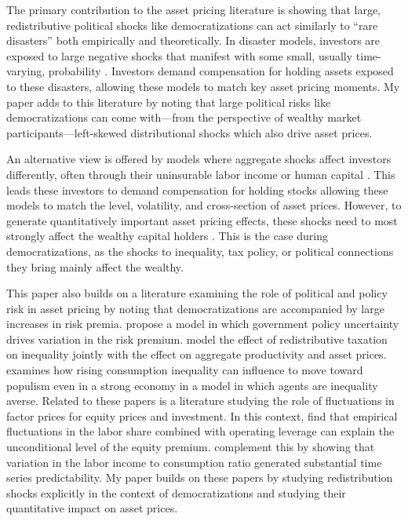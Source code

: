 The primary contribution to the asset pricing literature is showing that large, redistributive political shocks like democratizations can act similarly to ``rare disasters'' both empirically and theoretically. In disaster models, investors are exposed to large negative shocks that manifest with some small, usually time-varying, probability \citep*{Rietz1988,Barro2006a,Gabaix2012,Wachter2013}. Investors demand compensation for holding assets exposed to these disasters, allowing these models to match key asset pricing moments. My paper adds to this literature by noting that large political risks like democratizations can come with---from the perspective of wealthy market participants---left-skewed distributional shocks which also drive asset prices.

An alternative view is offered by models where aggregate shocks affect investors differently, often through their uninsurable labor income or human capital \citep{Mankiw1986, Constantinides1996,Constantinides2017, Schmidt2016,Paron2021}.  This leads these investors to demand compensation for holding stocks allowing these models to match the level, volatility, and cross-section of asset prices. However, to generate quantitatively important asset pricing effects, these shocks need to most strongly affect the wealthy capital holders \citep*{Catherine2021}. This is the case during democratizations, as the shocks to inequality, tax policy, or political connections they bring mainly affect the wealthy.

This paper also builds on a literature examining the role of political and policy risk in asset pricing by noting that democratizations are accompanied by large increases in risk premia. \cite*{Pastor2012,Pastor2013} propose a model in which government policy uncertainty drives variation in the risk premium.  \cite*{Pastor2016} model the effect of redistributive taxation on inequality jointly with the effect on aggregate productivity and asset prices.  \cite{Pastor2021} examines how rising consumption inequality can influence to move toward populism even in a strong economy in a model in which agents are inequality averse.  Related to these papers is a literature studying the role of fluctuations in factor prices for equity prices and investment. In this context, \cite{Danthine2002} find that empirical fluctuations in the labor share combined with operating leverage can explain the unconditional level of the equity premium. \cite{Santos2005} complement this by showing that variation in the labor income to consumption ratio generated substantial time series predictability.  My paper builds on these papers by studying redistribution shocks explicitly in the context of democratizations and studying their quantitative impact on asset prices.

